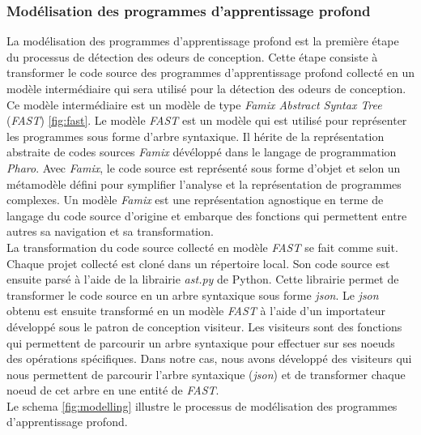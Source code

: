 \subsubsection{Modélisation des programmes d'apprentissage profond}
\label{sec:Meta-modélisation des programmes d'apprentissage profond}
La modélisation des programmes d'apprentissage profond est la première
étape du processus de détection des odeurs de conception. Cette étape consiste à transformer le code source des programmes
d'apprentissage profond collecté en un modèle intermédiaire qui sera utilisé pour la
détection des odeurs de conception. Ce modèle intermédiaire est un modèle de
type \emph{Famix Abstract Syntax Tree} (\emph{FAST}) \ref{fig:fast}. Le modèle \emph{FAST} est un modèle qui
est utilisé pour représenter les programmes sous forme d'arbre syntaxique. Il
hérite de la représentation abstraite de codes sources \emph{Famix} dévéloppé
dans le langage de programmation \emph{Pharo}. Avec \emph{Famix}, le code
source est représenté sous forme d'objet et selon un métamodèle défini pour symplifier l'analyse et
la représentation de programmes complexes. Un modèle \emph{Famix} est une
représentation agnostique en terme de langage du code source d'origine et embarque des
fonctions qui permettent entre autres sa navigation et sa transformation.\\

La transformation du code source collecté en modèle \emph{FAST} se fait comme suit.
Chaque projet collecté est cloné dans un répertoire local. Son code source est
ensuite parsé à l'aide de la librairie \emph{ast.py} de Python. Cette librairie
permet de transformer le code source en un arbre syntaxique sous forme \emph{json}. Le
\emph{json} obtenu est ensuite transformé en un modèle \emph{FAST} à l'aide d'un importateur
développé sous le patron de conception visiteur. Les visiteurs sont des fonctions
qui permettent de parcourir un arbre syntaxique pour effectuer sur ses noeuds des opérations
spécifiques. Dans notre cas, nous avons développé des visiteurs qui
nous permettent de parcourir l'arbre syntaxique (\emph{json}) et de transformer chaque
noeud de cet arbre en une entité de \emph{FAST}.\\

Le schema \ref{fig:modelling} illustre le processus de modélisation des
programmes d'apprentissage profond.\\

